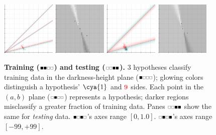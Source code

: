         \begin{figure}[h]
            \centering
            \includegraphics[width=0.23\textwidth]{example-mnist/new-train.png}%
            \hspace{0.01\textwidth}%
            \includegraphics[width=0.23\textwidth]{example-mnist/new-train-scat.png}%
            \hspace{0.02\textwidth}%
            \includegraphics[width=0.23\textwidth]{example-mnist/new-test.png}%
            \hspace{0.01\textwidth}%
            \includegraphics[width=0.23\textwidth]{example-mnist/new-test-scat.png}
            \caption{
              \textbf{Training
              ($\protect\offourline{01}$) and testing
              ($\protect\offourline{23}$).}
              $3$ hypotheses classify training data in the darkness-height
              plane ($\protect\offourline{0}$); glowing colors distinguish a
              hypothesis' $\cya{1}$ and $\red{9}$ sides.
              Each point in the $(a,b)$ plane ($\protect\offourline{1}$)
              represents a hypothesis; darker regions misclassify a greater
              fraction of training data.
              Panes $\protect\offourline{23}$ show the same for
              \emph{testing} data.
              $\protect\offourline{02}$'s axes range $[0, 1.0]$.
              $\protect\offourline{13}$'s axes range $[-99,+99]$.
            }
            \label{fig:train-test-digits}
        \end{figure}



